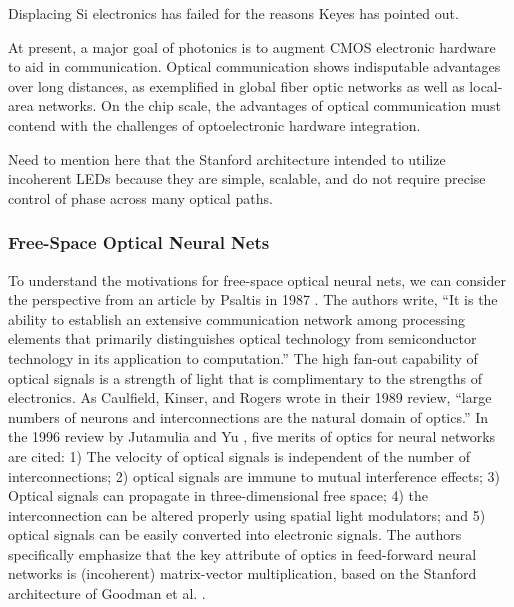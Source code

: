 Displacing Si electronics has failed for the reasons Keyes has pointed out.

At present, a major goal of photonics is to augment CMOS electronic hardware to aid in communication. Optical communication shows indisputable advantages over long distances, as exemplified in global fiber optic networks as well as local-area networks. On the chip scale, the advantages of optical communication must contend with the challenges of optoelectronic hardware integration. 


\vspace{3em}
Need to mention here that the Stanford architecture intended to utilize incoherent LEDs because they are simple, scalable, and do not require precise control of phase across many optical paths.


\subsubsection{Free-Space Optical Neural Nets}
To understand the motivations for free-space optical neural nets, we can consider the perspective from an article by Psaltis in 1987 \cite{abps1987}. The authors write, ``It is the ability to establish an extensive communication network among processing elements that primarily distinguishes optical technology from semiconductor technology in its application to computation.'' The high fan-out capability of optical signals is a strength of light that is complimentary to the strengths of electronics.  As Caulfield, Kinser, and Rogers wrote in their 1989 review, ``large numbers of neurons and interconnections are the natural domain of optics.'' In the 1996 review by Jutamulia and Yu \cite{juya1996}, five merits of optics for neural networks are cited: 1) The velocity of optical signals is independent of the number of interconnections; 2) optical signals are immune to mutual interference effects; 3) Optical signals can propagate in three-dimensional free space; 4) the interconnection can be altered properly using spatial light modulators; and 5) optical signals can be easily converted into electronic signals. The authors specifically emphasize that the key attribute of optics in feed-forward neural networks is (incoherent) matrix-vector multiplication, based on the Stanford architecture of Goodman et al. \cite{godi1978}. 

